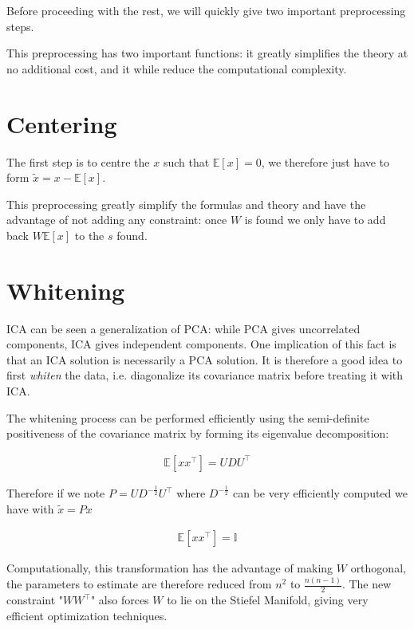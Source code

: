 \documentclass[a4paper,BCOR=5mm,oneside,openany]{scrreprt}
\begin{document}
Before proceeding with the rest, we will quickly give two important preprocessing steps. 

This preprocessing has two important functions: it greatly simplifies the theory at no additional cost, and it while reduce the computational complexity.

\section{Centering}

The first step is to centre the $x$ such that $\mathbb{E} \left[ x \right] = 0$, we therefore just have to form $\tilde{x} = x -\mathbb{E} \left[ x \right]$.

This preprocessing greatly simplify the formulas and theory and have the advantage of not adding any constraint: once $W$ is found we only have to add back $W \mathbb{E} \left[ x \right]$ to the $s$ found.

\section{Whitening}\label{whitening}

ICA can be seen a generalization of PCA: while PCA gives uncorrelated components, ICA gives independent components. One implication of this fact is that an ICA solution is necessarily a PCA solution. It is therefore a good idea to first \emph{whiten} the data, i.e. diagonalize its covariance matrix before treating it with ICA.

The whitening process can be performed efficiently using the semi-definite positiveness of the covariance matrix by forming its eigenvalue decomposition:

\begin{align*}
	\mathbb{E} \left[ x x^\intercal \right] = U D U^\intercal
\end{align*}

Therefore if we note $P = U D^{-\frac{1}{2}} U^\intercal$ where $D^{-\frac{1}{2}}$ can be very efficiently computed we have with $\tilde{x} = P x$

\begin{align*}
	\mathbb{E} \left[ x x^\intercal \right] = \mathbb{I}
\end{align*}

Computationally, this transformation has the advantage of making $W$ orthogonal, the parameters to estimate are therefore reduced from $n^2$ to $\frac{n (n-1)}{2}$. The new constraint "$W W^\intercal$" also forces $W$ to lie on the Stiefel Manifold, giving very efficient optimization techniques.
\end{document}
